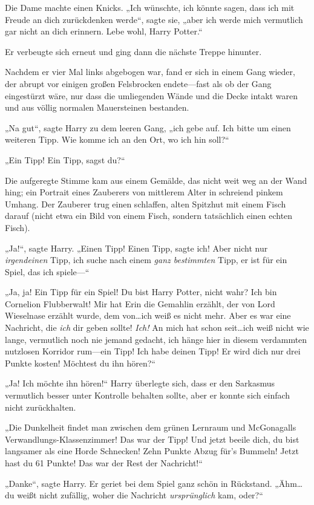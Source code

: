 {Die Dame machte einen Knicks. „Ich wünschte, ich könnte sagen, dass ich mit Freude an dich zurückdenken werde“, sagte sie, „aber ich werde mich vermutlich gar nicht an dich erinnern. Lebe wohl, Harry Potter.“

Er verbeugte sich erneut und ging dann die nächste Treppe hinunter.

Nachdem er vier Mal links abgebogen war, fand er sich in einem Gang wieder, der abrupt vor einigen großen Felsbrocken endete—fast als ob der Gang eingestürzt wäre, nur dass die umliegenden Wände und die Decke intakt waren und aus völlig normalen Mauersteinen bestanden.

„Na gut“, sagte Harry zu dem leeren Gang, „ich gebe auf. Ich bitte um einen weiteren Tipp. Wie komme ich an den Ort, wo ich hin soll?“

„Ein Tipp! Ein Tipp, sagst du?“

Die aufgeregte Stimme kam aus einem Gemälde, das nicht weit weg an der Wand hing; ein Portrait eines Zauberers von mittlerem Alter in schreiend pinkem Umhang. Der Zauberer trug einen schlaffen, alten Spitzhut mit einem Fisch darauf (nicht etwa ein Bild von einem Fisch, sondern tatsächlich einen echten Fisch).

„Ja!“, sagte Harry. „Einen Tipp! Einen Tipp, sagte ich! Aber nicht nur \emph{irgendeinen} Tipp, ich suche nach einem \emph{ganz bestimmten} Tipp, er ist für ein Spiel, das ich spiele—“

„Ja, ja! Ein Tipp für ein Spiel! Du bist Harry Potter, nicht wahr? Ich bin Cornelion Flubberwalt! Mir hat Erin die Gemahlin erzählt, der von Lord Wieselnase erzählt wurde, dem von…ich weiß es nicht mehr. Aber es war eine Nachricht, die \emph{ich} dir geben sollte! \emph{Ich!} An mich hat schon seit…ich weiß nicht wie lange, vermutlich noch nie jemand gedacht, ich hänge hier in diesem verdammten nutzlosen Korridor rum—ein Tipp! Ich habe deinen Tipp! Er wird dich nur drei Punkte kosten! Möchtest du ihn hören?“

„Ja! Ich möchte ihn hören!“ Harry überlegte sich, dass er den Sarkasmus vermutlich besser unter Kontrolle behalten sollte, aber er konnte sich einfach nicht zurückhalten.

„Die Dunkelheit findet man zwischen dem grünen Lernraum und McGonagalls Verwandlungs-Klassenzimmer! Das war der Tipp! Und jetzt beeile dich, du bist langsamer als eine Horde Schnecken! Zehn Punkte Abzug für's Bummeln! Jetzt hast du 61 Punkte! Das war der Rest der Nachricht!“

„Danke“, sagte Harry. Er geriet bei dem Spiel ganz schön in Rückstand. „Ähm…du weißt nicht zufällig, woher die Nachricht \emph{ursprünglich} kam, oder?“

}
